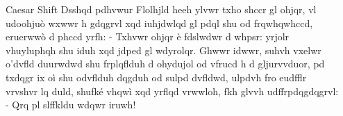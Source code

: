 \documentclass[final,hyperref={pdfpagelabels=false}]{beamer}
\begin{document}
\begin{frame}{}
\begin{columns}[t]
\begin{column}{.1\linewidth}
\begin{block}{Caesar Shift}
Dsshqd pdhvwur Flolhjld heeh ylvwr txho shccr gl ohjqr, vl udoohjuò wxwwr h gdqgrvl xqd iuhjdwlqd gl pdql shu od frqwhqwhccd, eruerwwò d phccd yrfh:
- Txhvwr ohjqr è fdslwdwr d whpsr: yrjolr vhuyluphqh shu iduh xqd jdped gl wdyrolqr.
Ghwwr idwwr, suhvh vxelwr o'dvfld duurwdwd shu frplqflduh d ohydujol od vfrucd h d gljurvvduor, pd txdqgr ix oì shu odvflduh dqgduh od sulpd dvfldwd, ulpdvh fro eudfflr vrvshvr lq duld, shufké vhqwì xqd yrflqd vrwwloh, fkh glvvh udffrpdqgdqgrvl:
- Qrq pl slffkldu wdqwr iruwh!
        \end{block}
    \end{column}
    \begin{column}{.3\linewidth}
    \end{column}
    \end{columns}
  \end{frame}
\end{document}
